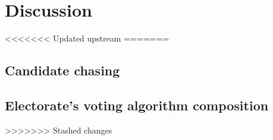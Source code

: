\section{Discussion}
\label{sec:discussion}

<<<<<<< Updated upstream
=======
\subsection{Candidate chasing}


\subsection{Electorate's voting algorithm composition}


>>>>>>> Stashed changes
